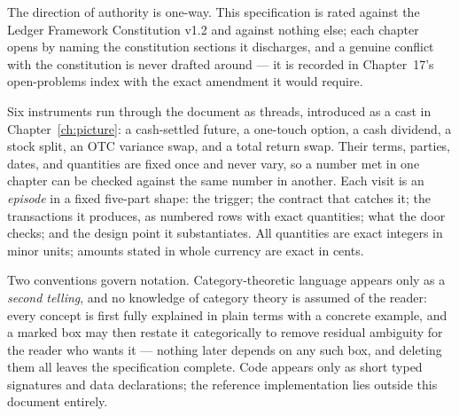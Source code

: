 The direction of authority is one-way. This specification is rated against the Ledger
Framework Constitution v1.2 and against nothing else; each chapter opens by naming the
constitution sections it discharges, and a genuine conflict with the constitution is
never drafted around --- it is recorded in Chapter~17's open-problems index with the
exact amendment it would require.

Six instruments run through the document as threads, introduced as a cast in
Chapter~\ref{ch:picture}: a cash-settled future, a one-touch option, a cash dividend,
a stock split, an OTC variance swap, and a total return swap. Their terms, parties,
dates, and quantities are fixed once and never vary, so a number met in one chapter
can be checked against the same number in another. Each visit is an \emph{episode} in
a fixed five-part shape: the trigger; the contract that catches it; the transactions
it produces, as numbered rows with exact quantities; what the door checks; and the
design point it substantiates. All quantities are exact integers in minor units;
amounts stated in whole currency are exact in cents.

Two conventions govern notation. Category-theoretic language appears only as a
\emph{second telling}, and no knowledge of category theory is assumed of the reader:
every concept is first fully explained in plain terms with a concrete example, and a
marked box may then restate it categorically to remove residual ambiguity for the reader
who wants it --- nothing later depends on any such box, and deleting them all
leaves the specification complete. Code appears only as short typed signatures and
data declarations; the reference implementation lies outside this document entirely.
